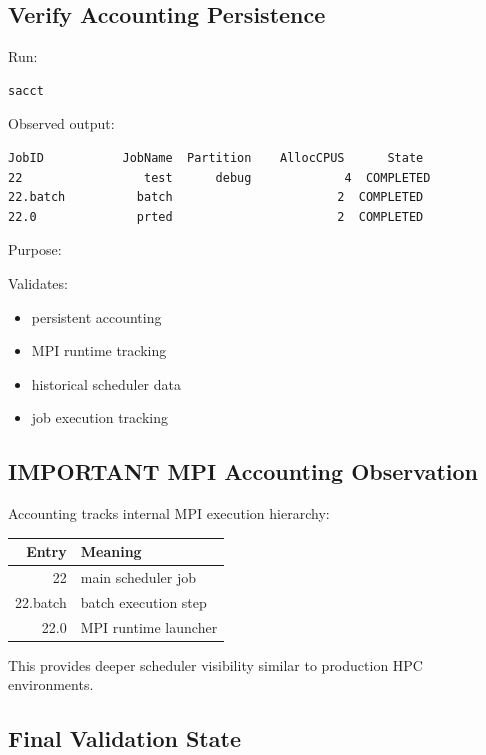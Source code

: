 \documentclass[11pt]{article}
\begin{document}
\subsection{Verify Accounting Persistence}
\label{sec:orgcf601ae}

Run:

\begin{verbatim}
sacct
\end{verbatim}

Observed output:

\begin{verbatim}
JobID           JobName  Partition    AllocCPUS      State
22                 test      debug             4  COMPLETED
22.batch          batch                       2  COMPLETED
22.0              prted                       2  COMPLETED
\end{verbatim}

Purpose:

Validates:

\begin{itemize}
\item persistent accounting
\item MPI runtime tracking
\item historical scheduler data
\item job execution tracking
\end{itemize}
\subsection{IMPORTANT MPI Accounting Observation}
\label{sec:org00ee071}

Accounting tracks internal MPI execution hierarchy:

\begin{center}
\begin{tabular}{rl}
Entry & Meaning\\
\hline
22 & main scheduler job\\
22.batch & batch execution step\\
22.0 & MPI runtime launcher\\
\end{tabular}
\end{center}

This provides deeper scheduler visibility similar to production HPC
environments.
\subsection{Final Validation State}
\label{sec:orgf584be8}
\end{document}
